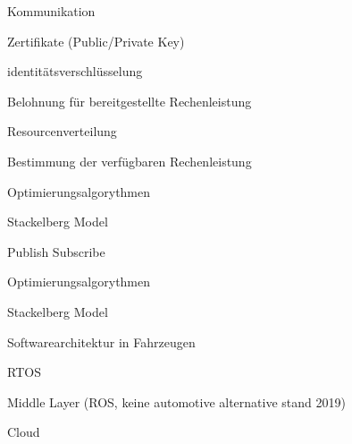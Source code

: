\begin{notes}

    \item Kommunikation
    \begin{notes}
        \item Zertifikate (Public/Private Key)
        \item identitätsverschlüsselung
        \item Belohnung für bereitgestellte Rechenleistung
    \end{notes}
    \item Resourcenverteilung
    \begin{notes}
        \item Bestimmung der verfügbaren Rechenleistung 
        \item Optimierungsalgorythmen
        \item Stackelberg Model
    \end{notes}
    \item Publish Subscribe
    \begin{notes}
        \item 
        \item Optimierungsalgorythmen
        \item Stackelberg Model
    \end{notes}
    \item Softwarearchitektur in Fahrzeugen
   \begin{notes}
        \item RTOS
        \item Middle Layer (ROS, keine automotive alternative stand 2019)
        \item Cloud
    \end{notes}
\end{notes}

